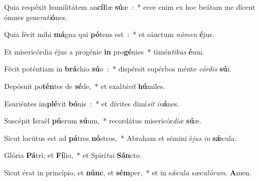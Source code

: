 \item Quia respéxit humilitátem an\textbf{cíl}\-læ \textbf{sú}\-æ~:~* ecce enim ex hoc beátam me dícent ómnes gene\emph{ra}\emph{ti}\textbf{ó}nes.
\item Quia fécit míhi \textbf{má}\-gna qui \textbf{pó}\-tens est~:~* et sánctum \emph{nó}\-\emph{men} \textbf{é}jus.
\item Et misericórdia éjus a progénie \textbf{in} pro\textbf{gé}\-nies~* timén\emph{ti}\-\emph{bus} \textbf{é}um.
\item Fécit poténtiam in \textbf{brá}\-chio \textbf{sú}\-o~:~* dispérsit supérbos ménte \emph{cór}\-\emph{dis} \textbf{sú}i.
\item Depósuit po\textbf{tén}\-tes de \textbf{sé}\-de,~* et exal\emph{tá}\-\emph{vit} \textbf{hú}miles.
\item Esuriéntes im\textbf{plé}\-vit \textbf{bó}\-nis~:~* et dívites dimí\emph{sit} \emph{in}\textbf{á}nes.
\item Suscépit Israël \textbf{pú}\-erum \textbf{sú}\-um,~* recordátus misericór\emph{di}\-\emph{æ} \textbf{sú}æ.
\item Sicut locútus est ad \textbf{pá}\-tres \textbf{nó}\-stros,~* Abraham et sémini é\emph{jus} \emph{in} \textbf{sǽ}cula.
\item Glória \textbf{Pá}\-tri, et \textbf{Fí}\-lio,~* et Spirí\emph{tu}\-\emph{i} \textbf{Sán}cto.
\item Sicut érat in princípio, et \textbf{núnc}, et \textbf{sém}\-per,~* et in sǽcula sæcu\emph{ló}\-\emph{rum}. \textbf{A}men.
